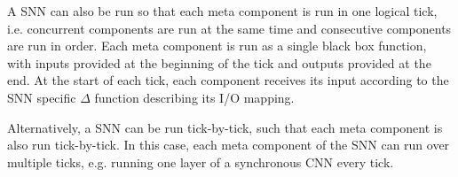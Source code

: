 A \ac{SNN} can also be run so that each meta component is run in one logical tick, i.e. concurrent components are run at the same time and consecutive components are run in order.
Each meta component is run as a single black box function, with inputs provided at the beginning of the tick and outputs provided at the end.
At the start of each tick, each component receives its input according to the \ac{SNN} specific $\Delta$ function describing its I/O mapping.

Alternatively, a \ac{SNN} can be run tick-by-tick, such that each meta component is also run tick-by-tick.
In this case, each meta component of the \ac{SNN} can run over multiple ticks, e.g. running one layer of a synchronous \ac{CNN} every tick.



